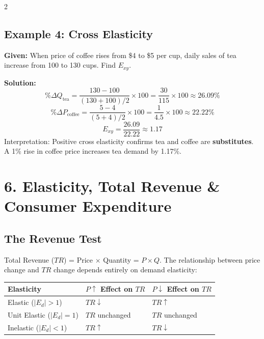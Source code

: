 \documentclass[10pt,a4paper]{article}
\begin{document}
\begin{multicols}{2}
\subsection*{Example 4: Cross Elasticity}
\textbf{Given:} When price of coffee rises from \$4 to \$5 per cup, daily sales of tea increase from 100 to 130 cups. Find $E_{xy}$.

\textbf{Solution:}
\[
\%\Delta Q_{\text{tea}} = \frac{130-100}{(130+100)/2} \times 100 = \frac{30}{115} \times 100 \approx 26.09\%
\]
\[
\%\Delta P_{\text{coffee}} = \frac{5-4}{(5+4)/2} \times 100 = \frac{1}{4.5} \times 100 \approx 22.22\%
\]
\[
E_{xy} = \frac{26.09}{22.22} \approx \mathbf{1.17}
\]
Interpretation: Positive cross elasticity confirms tea and coffee are \textbf{substitutes}. A 1\% rise in coffee price increases tea demand by 1.17\%.

\columnbreak

\section*{6. Elasticity, Total Revenue \& Consumer Expenditure}

\subsection*{The Revenue Test}
Total Revenue ($TR$) = Price $\times$ Quantity = $P \times Q$. The relationship between price change and $TR$ change depends entirely on demand elasticity:

\begin{center}
\begin{tabular}{@{}p{1.5cm}p{2.2cm}p{2.2cm}@{}}
\toprule
\textbf{Elasticity} & \textbf{$P \uparrow$ Effect on $TR$} & \textbf{$P \downarrow$ Effect on $TR$} \\
\midrule
Elastic ($|E_d|>1$) & $TR \downarrow$ & $TR \uparrow$ \\
Unit Elastic ($|E_d|=1$) & $TR$ unchanged & $TR$ unchanged \\
Inelastic ($|E_d|<1$) & $TR \uparrow$ & $TR \downarrow$ \\
\bottomrule
\end{tabular}
\end{center}


\end{multicols}
\end{document}
